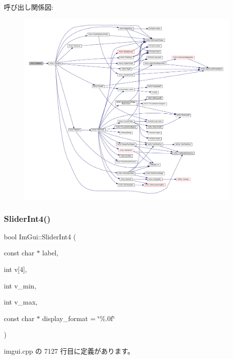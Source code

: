 呼び出し関係図\+:\nopagebreak
\begin{figure}[H]
\begin{center}
\leavevmode
\includegraphics[width=350pt]{namespace_im_gui_a099188a7fdaad1a8103e6e24f41e1a8a_cgraph}
\end{center}
\end{figure}
\mbox{\label{namespace_im_gui_a88c24aa0e5af4cbb14559b5789886810}} 
\subsubsection{\texorpdfstring{Slider\+Int4()}{SliderInt4()}}
{\footnotesize\ttfamily bool Im\+Gui\+::\+Slider\+Int4 (\begin{DoxyParamCaption}\item[{const char $\ast$}]{label,  }\item[{int}]{v\mbox{[}4\mbox{]},  }\item[{int}]{v\+\_\+min,  }\item[{int}]{v\+\_\+max,  }\item[{const char $\ast$}]{display\+\_\+format = {\ttfamily \char`\"{}\%.0f\char`\"{}} }\end{DoxyParamCaption})}



 imgui.\+cpp の 7127 行目に定義があります。

